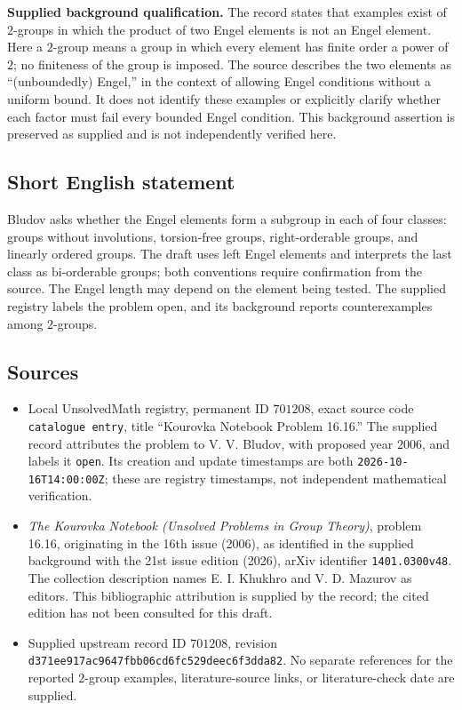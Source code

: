 \documentclass[11pt]{article}
\begin{document}
\textbf{Supplied background qualification.} The record states that examples exist of \(2\)-groups in which the product of two Engel elements is not an Engel element. Here a \(2\)-group means a group in which every element has finite order a power of \(2\); no finiteness of the group is imposed. The source describes the two elements as ``(unboundedly) Engel,'' in the context of allowing Engel conditions without a uniform bound. It does not identify these examples or explicitly clarify whether each factor must fail every bounded Engel condition. This background assertion is preserved as supplied and is not independently verified here.
\subsection{Short English statement}
Bludov asks whether the Engel elements form a subgroup in each of four classes: groups without involutions, torsion-free groups, right-orderable groups, and linearly ordered groups. The draft uses left Engel elements and interprets the last class as bi-orderable groups; both conventions require confirmation from the source. The Engel length may depend on the element being tested. The supplied registry labels the problem open, and its background reports counterexamples among \(2\)-groups.
\subsection{Sources}
\begin{itemize}
\item Local UnsolvedMath registry, permanent ID \(701208\), exact source code \texttt{catalogue entry}, title ``Kourovka Notebook Problem 16.16.'' The supplied record attributes the problem to V. V. Bludov, with proposed year \(2006\), and labels it \texttt{open}. Its creation and update timestamps are both \texttt{2026-10-16T14:00:00Z}; these are registry timestamps, not independent mathematical verification.
\item \emph{The Kourovka Notebook (Unsolved Problems in Group Theory)}, problem 16.16, originating in the 16th issue (2006), as identified in the supplied background with the 21st issue edition (2026), arXiv identifier \texttt{1401.0300v48}. The collection description names E. I. Khukhro and V. D. Mazurov as editors. This bibliographic attribution is supplied by the record; the cited edition has not been consulted for this draft.
\item Supplied upstream record ID \(701208\), revision \texttt{d371ee917ac9647fbb06cd6fc529deec6f3dda82}. No separate references for the reported \(2\)-group examples, literature-source links, or literature-check date are supplied.
\end{itemize}
\end{document}
